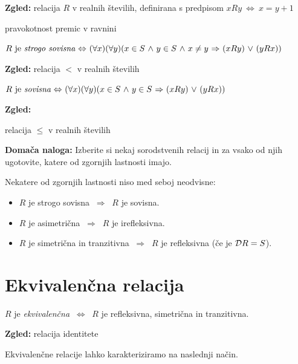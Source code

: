\documentclass[11pt,paper=b5,footinclude,headinclude]{scrbook} %
\def\ali {{~\vee~}}
\def\inn {{~\wedge~}}
\def\sledi {{~\Rightarrow~}}
\def\cee {{~\Leftrightarrow~}}
\begin{document}

\textbf{ Zgled:}
relacija $R$ v realnih številih, definirana s predpisom $xRy \cee x = y + 1$

pravokotnost premic v ravnini

\bigskip

$R \textrm{ je {\em strogo sovisna}} \cee (\forall x)(\forall y)(x\in S\inn y\in S
\inn x\neq y\sledi (xRy)\ali (yRx))$


\textbf{ Zgled:}
relacija $<$ v realnih  številih

\bigskip

$R \textrm{ je {\em sovisna}} \cee (\forall x)(\forall y)(x\in S\inn y\in S
\sledi (xRy)\ali (yRx))$


\textbf{ Zgled:}

relacija $\le$ v realnih številih

\bigskip
\textbf{ Domača naloga:}
Izberite si nekaj sorodstvenih relacij in za vsako od njih ugotovite, katere od zgornjih lastnosti imajo.

\bigskip
Nekatere od zgornjih lastnosti niso med seboj neodvisne:
\begin{itemize}
  \item $R$ je strogo sovisna $\sledi$ $R$ je sovisna.
  \item $R$ je asimetrična $\sledi$ $R$ je irefleksivna.
  \item $R$ je simetrična in tranzitivna $\sledi$ $R$ je refleksivna (če je ${\cal D}R = S$).
\end{itemize}

\section{Ekvivalenčna relacija}

$R$ je {\em ekvivalenčna} $\cee$ $R$ je refleksivna, simetrična in tranzitivna.

\textbf{ Zgled:} relacija identitete

\bigskip
Ekvivalenčne relacije lahko karakteriziramo na naslednji način.
\end{document}

